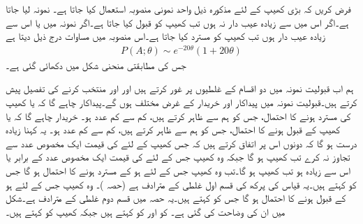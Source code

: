 \quad
فرض کریں کہ بڑی کھیپ کے لئے مذکورہ ذیل واحد نمونی منصوبہ استعمال کیا جاتا ہے۔ نمونہ لیا جاتا ہے۔اگر اس میں  سے زیادہ عیب دار نہ ہوں تب کھیپ کو قبول کیا جاتا ہے۔اگر نمونہ میں  یا اس سے زیادہ عیب دار ہوں تب کھیپ کو مسترد کیا جاتا ہے۔اس منصوبہ میں مساوات  درج ذیل دیتا ہے
\begin{align*}
P(A;\theta)\sim e^{-20\theta} (1+20\theta)
\end{align*}
جس کی مطابقتی منحنی شکل  میں دکھائی گئی ہے۔

ہم اب قبولیت نمونہ میں دو اقسام کے غلطیوں پر غور کرتے ہیں اور  اور  منتخب کرنے کی تفصیل پیش کرتے ہیں۔قبولیت نمونہ میں پیداکار اور خریدار کے غرض مختلف ہوں گے۔پیداکار چاہے گا کہ  یا  کھیپ کی مسترد ہونے کا احتمال، جس کو ہم  سے ظاہر کرتے ہیں، کم سے کم  عدد  ہو۔ خریدار چاہے گا کہ  یا  کھیپ کے قبول ہونے کا احتمال، جس کو ہم  سے ظاہر کرتے ہیں، کم سے کم عدد ہو۔ یہ کہنا زیادہ درست ہو گا کہ دونوں اس پر اتفاق کرتے ہیں کہ جس کھیپ کے لئے  کی قیمت ایک مخصوص عدد  سے تجاوز نہ کرے تب کھیپ   ہو  گا جبکہ وہ کھیپ جس کے لئے   کی قیمت ایک مخصوص عدد   کے برابر یا اس  سے زیادہ ہو تب کھیپ  ہو گا۔تب وہ کھیپ جس کے لئے  ہو کے مسترد ہونے  کا احتمال  ہو گا جس کو  کہتے ہیں۔یہ قیاس کی پرکھ کی قسم اول غلطی  کے مترادف ہے (حصہ )۔  وہ کھیپ جس کے لئے  ہو کے قبول ہونے  کا احتمال  ہو گا جس کو  کہتے ہیں۔یہ حصہ  میں قسم دوم  غلطی  کے مترادف ہے۔شکل  میں ان کی وضاحت کی گئی ہے۔  کو  اور  کو  کہتے ہیں جبکہ کھیپ  کو  کہتے ہیں۔

